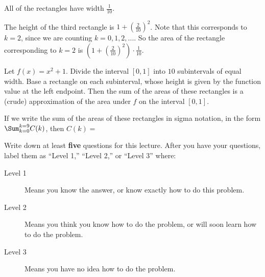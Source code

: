 \documentclass{ximera}
\begin{document}
\begin{question}
	\begin{hint}
		All of the rectangles have width $\frac{1}{10}$.
	\end{hint}
	\begin{hint}
		The height of the third rectangle is $1+(\frac{2}{10})^2$.  Note that this corresponds to $k=2$, since we are counting $k=0,1,2,...$.  So the area of the rectangle corresponding to $k=2$ is $(1+(\frac{2}{10})^2) \cdot \frac{1}{10}$.
	\end{hint}
	Let $f(x) = x^2+1$.  Divide the interval $[0,1]$ into $10$ subintervals of equal width.  Base a rectangle on each subinterval, whose height is given by the function value at the left endpoint.  Then the sum of the areas of these rectangles is a (crude) approximation of the area under $f$ on the interval $[0,1]$.
	
	
	If we write the sum of the areas of these rectangles in sigma notation, in the form $\Sum_{k=0}^{k=9} C(k)$, then $C(k) = $
\end{question}

Write down at least \textbf{five} questions for this lecture. After
you have your questions, label them as ``Level 1,'' ``Level 2,'' or ``Level 3'' where:
\begin{description}
\item[Level 1] Means you know the answer, or know exactly how to do this problem.
\item[Level 2] Means you think you know how to do the problem, or will soon learn how to do the problem.
\item[Level 3] Means you have no idea how to do the problem. 
\end{description}
\begin{question}
  \begin{freeResponse}
  \end{freeResponse}
\end{question}
\end{document}
